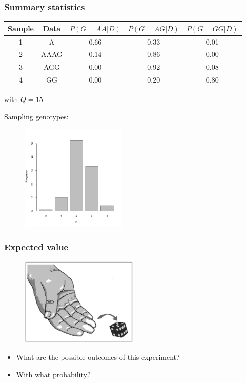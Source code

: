 \begin{frame}
\frametitle{Summary statistics}

	\tiny{
        \begin{center}
                \begin{tabular}{c | c | c | c | c}
                        Sample & Data & $P(G=AA|D)$ & $P(G=AG|D)$ & $P(G=GG|D)$\\
                        \hline
                        1 & A & 0.66 & 0.33 & 0.01\\
                        2 & AAAG & 0.14 & 0.86 & 0.00\\
                        3 & AGG & 0.00 & 0.92 & 0.08\\
                        4 & GG & 0.00 & 0.20 & 0.80\\
                        \hline
                \end{tabular}
                with $Q=15$
        \end{center}
	}
	
	Sampling genotypes:
	\begin{figure}
		\includegraphics[width=0.45\textwidth]{Pics/H.png}
	\end{figure}


\end{frame}


\begin{frame}
\frametitle{Expected value}

	\begin{figure}
                \includegraphics[width=0.5\textwidth]{Pics/die.png}
        \end{figure}

	\begin{itemize}
		\item What are the possible outcomes of this experiment?
		\item With what probability?
	\end{itemize}

\end{frame}

